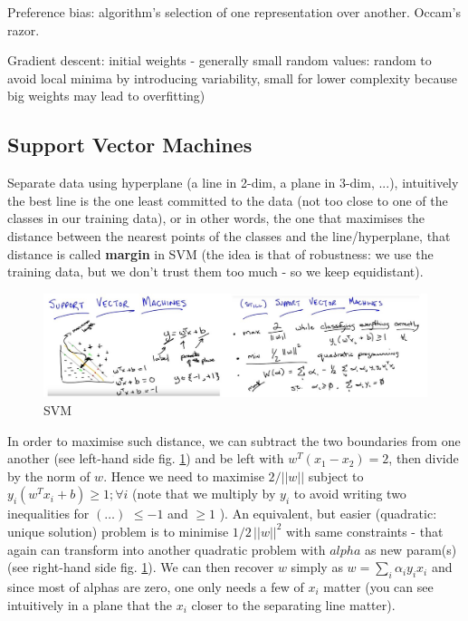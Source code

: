 \documentclass[11pt]{article}
\begin{document}
Preference bias: algorithm's selection of one representation over another. Occam's razor.

Gradient descent: initial weights - generally small random values: random to avoid local minima by introducing variability, small for lower complexity because big weights may lead to overfitting)

\subsection{Support Vector Machines}
Separate data using hyperplane (a line in 2-dim, a plane in 3-dim, ...), intuitively the best line is the one least committed to the data (not too close to one of the classes in our training data), or in other words, the one that maximises the distance between the nearest points of the classes and the line/hyperplane, that distance is called \textbf{margin} in SVM (the idea is that of robustness: we use the training data, but we don't trust them too much - so we keep equidistant).
\begin{figure}[htbp] 
	\centering
	\includegraphics[width=1.\textwidth]{pics/SVM}
	\caption{SVM} 
	\label{SVM}
\end{figure}

In order to maximise such distance, we can subtract the two boundaries from one another (see left-hand side fig. \ref{SVM}) and be left with $w^T (x_1-x_2) = 2$, then divide by the norm of $w$. Hence we need to maximise $2 /||w|| $ subject to $y_i (w^T x_i + b) \geq 1 ;\forall i$ (note that we multiply by $y_i$ to avoid writing two inequalities for $(\dots)$ $\leq -1$ and $\geq 1$ ). 
An equivalent, but easier (quadratic: unique solution) problem is to minimise $1/2 \,||w||^2$ with same constraints - that again can transform into another quadratic problem with $alpha$ as new param(s) (see right-hand side fig. \ref{SVM}). We can then recover $w$ simply as $w=\sum_i \alpha_i y_i x_i$ and since most of alphas are zero, one only needs a few of $x_i$ matter (you can see intuitively in a plane that the $x_i$ closer to the separating line matter).
\end{document}
